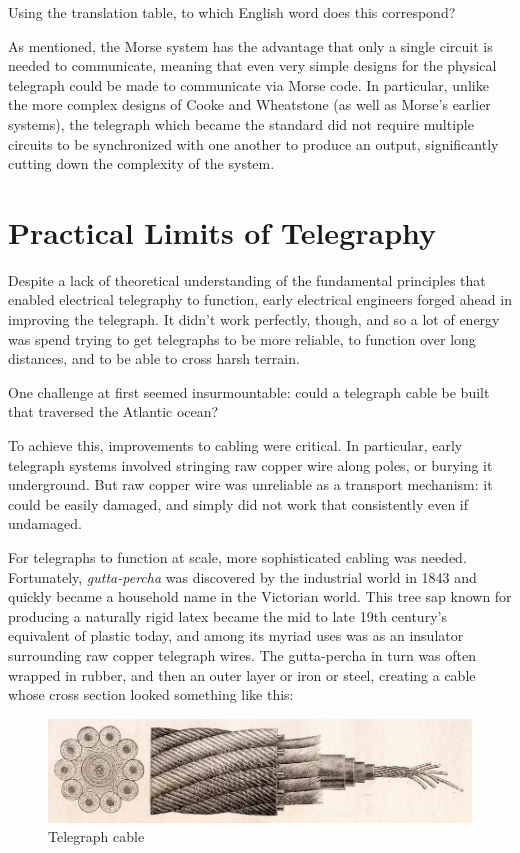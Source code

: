 \documentclass[UTF8]{book}
\begin{document}
\begin{CJK}{UTF8}{gbsn}
Using the translation table, to which English word does this correspond?

As mentioned, the Morse system has the advantage that only a single circuit is needed to communicate, meaning that even very simple designs for the physical telegraph could be made to communicate via Morse code. In particular, unlike the more complex designs of Cooke and Wheatstone (as well as Morse's earlier systems), the telegraph which became the standard did not require multiple circuits to be synchronized with one another to produce an output, significantly cutting down the complexity of the system.

\section{Practical Limits of Telegraphy}

Despite a lack of theoretical understanding of the fundamental principles that enabled electrical telegraphy to function, early electrical engineers forged ahead in improving the telegraph. It didn't work perfectly, though, and so a lot of energy was spend trying to get telegraphs to be more reliable, to function over long distances, and to be able to cross harsh terrain.

One challenge at first seemed insurmountable: could a telegraph cable be built that traversed the Atlantic ocean?

To achieve this, improvements to cabling were critical. In particular, early telegraph systems involved stringing raw copper wire along poles, or burying it underground. But raw copper wire was unreliable as a transport mechanism: it could be easily damaged, and simply did not work that consistently even if undamaged.

For telegraphs to function at scale, more sophisticated cabling was needed. Fortunately, \emph{gutta-percha} was discovered by the industrial world in 1843 and quickly became a household name in the Victorian world. This tree sap known for producing a naturally rigid latex became the mid to late 19th century's equivalent of plastic today, and among its myriad uses was as an insulator surrounding raw copper telegraph wires. The gutta-percha in turn was often wrapped in rubber, and then an outer layer or iron or steel, creating a cable whose cross section looked something like this:

\begin{figure}[H]
\centering
\includegraphics[width=0.8\linewidth]{cable-cross-section}
\caption{Telegraph cable}
\end{figure}


\end{CJK}
\end{document}
